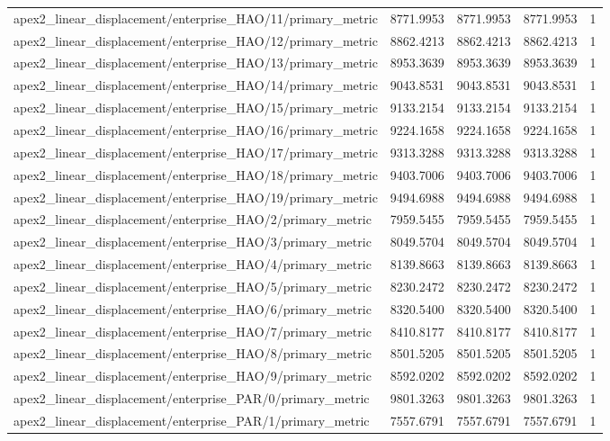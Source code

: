 \begin{table}[h]
\begin{tabular}{lrrrr}
apex2_linear_displacement/enterprise_HAO/11/primary_metric & 8771.9953 & 8771.9953 & 8771.9953 & 1 \\
apex2_linear_displacement/enterprise_HAO/12/primary_metric & 8862.4213 & 8862.4213 & 8862.4213 & 1 \\
apex2_linear_displacement/enterprise_HAO/13/primary_metric & 8953.3639 & 8953.3639 & 8953.3639 & 1 \\
apex2_linear_displacement/enterprise_HAO/14/primary_metric & 9043.8531 & 9043.8531 & 9043.8531 & 1 \\
apex2_linear_displacement/enterprise_HAO/15/primary_metric & 9133.2154 & 9133.2154 & 9133.2154 & 1 \\
apex2_linear_displacement/enterprise_HAO/16/primary_metric & 9224.1658 & 9224.1658 & 9224.1658 & 1 \\
apex2_linear_displacement/enterprise_HAO/17/primary_metric & 9313.3288 & 9313.3288 & 9313.3288 & 1 \\
apex2_linear_displacement/enterprise_HAO/18/primary_metric & 9403.7006 & 9403.7006 & 9403.7006 & 1 \\
apex2_linear_displacement/enterprise_HAO/19/primary_metric & 9494.6988 & 9494.6988 & 9494.6988 & 1 \\
apex2_linear_displacement/enterprise_HAO/2/primary_metric & 7959.5455 & 7959.5455 & 7959.5455 & 1 \\
apex2_linear_displacement/enterprise_HAO/3/primary_metric & 8049.5704 & 8049.5704 & 8049.5704 & 1 \\
apex2_linear_displacement/enterprise_HAO/4/primary_metric & 8139.8663 & 8139.8663 & 8139.8663 & 1 \\
apex2_linear_displacement/enterprise_HAO/5/primary_metric & 8230.2472 & 8230.2472 & 8230.2472 & 1 \\
apex2_linear_displacement/enterprise_HAO/6/primary_metric & 8320.5400 & 8320.5400 & 8320.5400 & 1 \\
apex2_linear_displacement/enterprise_HAO/7/primary_metric & 8410.8177 & 8410.8177 & 8410.8177 & 1 \\
apex2_linear_displacement/enterprise_HAO/8/primary_metric & 8501.5205 & 8501.5205 & 8501.5205 & 1 \\
apex2_linear_displacement/enterprise_HAO/9/primary_metric & 8592.0202 & 8592.0202 & 8592.0202 & 1 \\
apex2_linear_displacement/enterprise_PAR/0/primary_metric & 9801.3263 & 9801.3263 & 9801.3263 & 1 \\
apex2_linear_displacement/enterprise_PAR/1/primary_metric & 7557.6791 & 7557.6791 & 7557.6791 & 1 \\

\end{tabular}
\end{table}
